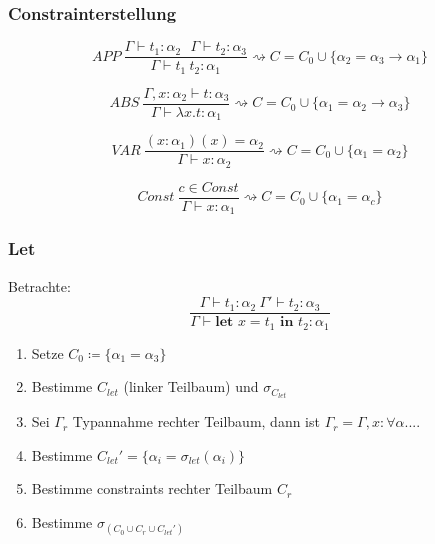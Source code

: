 \subsubsection{Constrainterstellung}
\label{typ:con:crea}
$$APP \medspace\frac{\Gamma \vdash t_1 : \alpha_2 \medspace\medspace\medspace \Gamma \vdash t_2 : \alpha_3}{\Gamma \vdash t_1 \medspace t_2 : \alpha_1} \rightsquigarrow C = C_0 \cup \{\alpha_2 = \alpha_3 \rightarrow \alpha_1\}$$

$$ABS \medspace\frac{\Gamma, x : \alpha_2 \vdash t : \alpha_3}{\Gamma \vdash \lambda x.t:\alpha_1} \rightsquigarrow C = C_0 \cup \{\alpha_1 = \alpha_2 \rightarrow \alpha_3\}$$

$$VAR \medspace\frac{(x: \alpha_1)(x) = \alpha_2}{\Gamma \vdash x : \alpha_2} \rightsquigarrow C = C_0 \cup \{\alpha_1 = \alpha_2\}$$

$$Const \medspace\frac{c \in Const}{\Gamma \vdash x : \alpha_1} \rightsquigarrow C = C_0 \cup \{\alpha_1 = \alpha_c\}$$

\subsubsection{Let}
Betrachte:
$$\frac{\Gamma \vdash t_1: \alpha_2 \medspace \Gamma' \vdash t_2: \alpha_3}{\Gamma \vdash \textbf{let } x = t_1 \textbf{ in } t_2 : \alpha_1}$$

\begin{enumerate}
	\item Setze $C_0 \coloneqq \{ \alpha_1 = \alpha_3 \}$
	\item Bestimme $C_{let}$ (linker Teilbaum) und $\sigma_{C_{let}}$
	\item Sei $\Gamma_r$ Typannahme rechter Teilbaum, dann ist $\Gamma_r = \Gamma, x: \forall \alpha. ...$
	\item Bestimme $C_{let}' = \{\alpha_i = \sigma_{let}(\alpha_i)\}$
	\item Bestimme constraints rechter Teilbaum $C_r$
	\item Bestimme $\sigma_{(C_0 \cup C_r \cup C_{let}')}$
\end{enumerate}